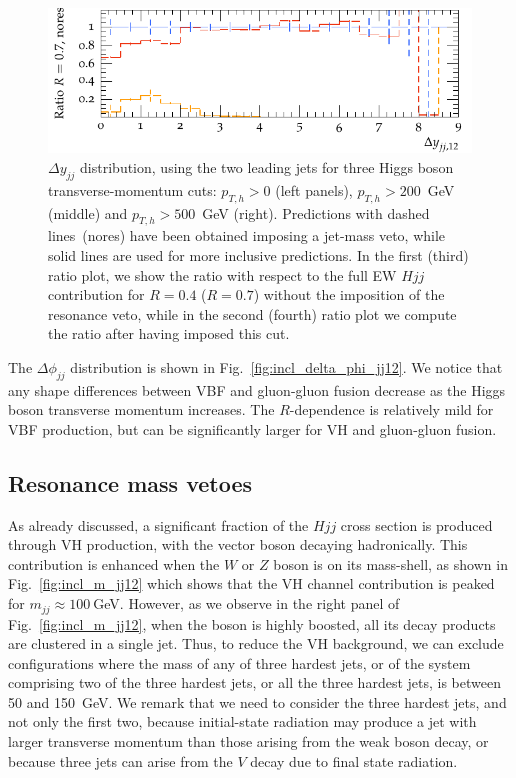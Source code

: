 \documentclass[10pt,prd,fleqn,superscriptaddress,notitlepage,nofootinbib,preprintnumbers,nobalancelastpage]{revtex4-1}
\newcommand{\VBF}{VBF\xspace}
\newcommand{\VH}{VH\xspace}
\begin{document}
\begin{figure}[p]
\begin{minipage}{0.28\textwidth}
    \includegraphics[width=\textwidth]{figures/vbfvh/nores-pt500-ratio4.pdf}
    \end{minipage}
    \caption{$\Delta y_{jj}$ distribution, using the two leading jets for three Higgs boson transverse-momentum cuts: $p_{T,h}>0$ (left panels), $p_{T,h}>200$~GeV (middle) and $p_{T,h}>500$~GeV (right).
    Predictions with dashed lines~(nores) have been obtained imposing a jet-mass veto, while solid lines are used for more inclusive predictions.
    In the first (third) ratio plot, we show the ratio with respect to the full EW $Hjj$ contribution for $R=0.4$ ($R=0.7$) without the imposition of the resonance veto, while in the second (fourth) ratio plot we compute the ratio after having imposed this cut.}
    \label{fig:deltay_massveto}
\end{figure}

The $\Delta\phi_{jj}$ distribution is shown in Fig.~\ref{fig:incl_delta_phi_jj12}. We notice that any shape differences between \VBF and gluon-gluon fusion decrease as the Higgs boson transverse momentum increases. The $R$-dependence is relatively mild for \VBF production, but can be significantly larger for \VH and gluon-gluon fusion.

\subsection{Resonance mass vetoes}
\label{sec:resonance}

As already discussed, a significant fraction of the $Hjj$ cross section is produced through \VH production, with the vector boson decaying hadronically. This contribution is enhanced when the $W$ or $Z$ boson is on its mass-shell, as shown in Fig.~\ref{fig:incl_m_jj12} which shows that the \VH channel contribution is peaked for $m_{jj}\approx100~$GeV.
However, as we observe in the right panel of Fig.~\ref{fig:incl_m_jj12}, when the boson is highly boosted, all its decay products are clustered in a single jet.
Thus, to reduce the \VH background, we can exclude configurations where the mass of any of three hardest jets, or of the system comprising two of the three hardest jets, or all the three hardest jets, is between 50 and 150~GeV. We remark that we need to consider the three hardest jets, and not only the first two, because initial-state radiation may produce a jet with larger transverse momentum than those arising from the weak boson decay, or because three jets can arise from the $V$ decay due to final state radiation.
\end{document}
